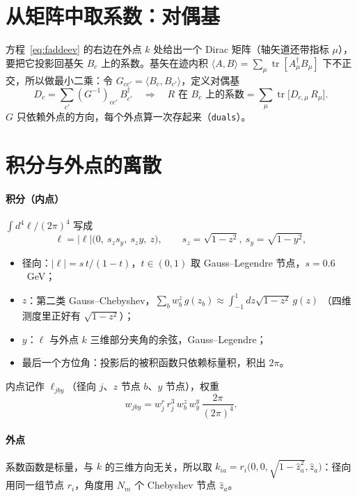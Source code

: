 \documentclass[11pt,a4paper]{ctexart}
\newcommand{\tr}{\operatorname{tr}}
\newcommand{\code}[1]{\texttt{#1}}
\begin{document}
\section{从矩阵中取系数：对偶基}

方程~\eqref{eq:faddeev} 的右边在外点 $k$ 处给出一个 Dirac 矩阵（轴矢道还带指标 $\mu$），
要把它投影回基矢 $B_c$ 上的系数。基矢在迹内积 $\langle A,B\rangle=\sum_\mu\tr[A_\mu^\dagger B_\mu]$
下不正交，所以做最小二乘：令 $G_{cc'}=\langle B_c,B_{c'}\rangle$，定义对偶基
\begin{equation}\label{eq:dual}
D_c=\sum_{c'}(G^{-1})_{cc'}\,B_{c'}^\dagger
\quad\Longrightarrow\quad
\text{$R$ 在 $B_c$ 上的系数}=\sum_\mu\tr\big[D_{c,\mu}\,R_\mu\big].
\end{equation}
$G$ 只依赖外点的方向，每个外点算一次存起来（\code{duals}）。

\section{积分与外点的离散}

\paragraph{积分（内点）} $\int d^4\ell/(2\pi)^4$ 写成
\[
\ell=|\ell|\big(0,\ s_z s_y,\ s_z y,\ z\big),\qquad s_z=\sqrt{1-z^2},\ s_y=\sqrt{1-y^2},
\]
\begin{itemize}
\item 径向：$|\ell|=s\,t/(1-t)$，$t\in(0,1)$ 取 Gauss--Legendre 节点，$s=0.6$~GeV；
\item $z$：第二类 Gauss--Chebyshev，$\sum_b w^z_b\,g(z_b)\approx\int_{-1}^{1}dz\sqrt{1-z^2}\,g(z)$
（四维测度里正好有 $\sqrt{1-z^2}$）；
\item $y$：$\ell$ 与外点 $k$ 三维部分夹角的余弦，Gauss--Legendre；
\item 最后一个方位角：投影后的被积函数只依赖标量积，积出 $2\pi$。
\end{itemize}
内点记作 $\ell_{jby}$（径向 $j$、$z$ 节点 $b$、$y$ 节点），权重
\begin{equation}\label{eq:weight}
w_{jby}=w^r_j\,r_j^3\,w^z_b\,w^y_y\,\frac{2\pi}{(2\pi)^4}.
\end{equation}

\paragraph{外点} 系数函数是标量，与 $k$ 的三维方向无关，所以取
$k_{ia}=r_i\big(0,0,\sqrt{1-\hat z_a^2},\hat z_a\big)$：径向用同一组节点 $r_i$，角度用 $N_m$ 个
Chebyshev 节点 $\hat z_a$。
\end{document}
